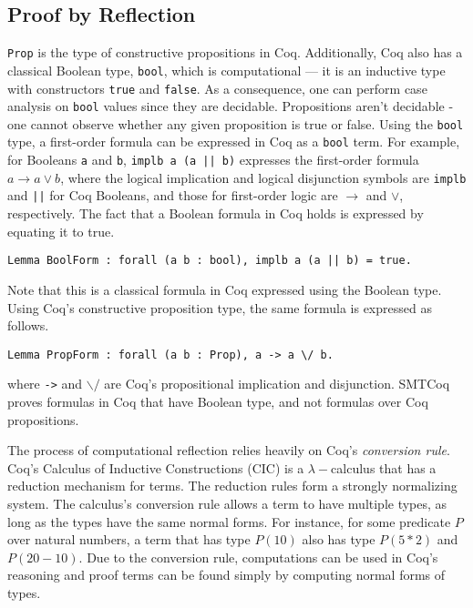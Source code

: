\documentclass{article}
\begin{document}
	\subsection{Proof by Reflection}
	\label{reflect}
	\texttt{Prop} is the type of 
	constructive propositions in Coq. 
	Additionally, Coq also has a 
	classical Boolean type, 
	\texttt{bool}, which is 
	computational --- it is an 
	inductive type with constructors 
	\texttt{true} and \texttt{false}. 
	As a consequence, one can 
	perform case analysis on 
	\texttt{bool} values since they 
	are decidable. Propositions 
	aren't decidable - one cannot 
	observe whether any given 
	proposition is true or false. 	
	Using the \texttt{bool} type, a 
	first-order formula can be 
	expressed in Coq as a \texttt{bool}
	term. For example, for Booleans 
	\texttt{a} and \texttt{b}, 
	\texttt{implb a (a || b)} 
	expresses the first-order formula 
	$a \to a \lor b$, where the logical 
	implication and logical disjunction 
	symbols are \texttt{implb} and 
	\texttt{||} for Coq Booleans, and 
	those for first-order logic are 
	$\to$ and $\lor$, respectively. The 
	fact that a Boolean formula in Coq 
	holds is expressed by equating it to 
	true.
\begin{verbatim}
Lemma BoolForm : forall (a b : bool), implb a (a || b) = true.
\end{verbatim}
	Note that this is a classical formula 
	in Coq expressed using the Boolean type. 
	Using Coq's constructive proposition type,
	the same formula is expressed as follows.
\begin{verbatim}
Lemma PropForm : forall (a b : Prop), a -> a \/ b.
\end{verbatim}
	where \texttt{->} and $\backslash/$ are 
	Coq's propositional implication and 
	disjunction. SMTCoq proves formulas 
	in Coq that have Boolean type, and 
	not formulas over Coq propositions.
	 
	The process of computational 
	reflection relies heavily on 
	Coq's \textit{conversion rule}.
	Coq's Calculus of Inductive 
	Constructions (CIC) is a 
	$\lambda-$calculus that has a 
	reduction mechanism for terms. The
	reduction rules form a strongly 
	normalizing system. The calculus's
	conversion rule allows a term to 
	have multiple types, as long as the 
	types have the same normal forms. For 
	instance, for some predicate $P$ 
	over natural numbers, a term that 
	has type $P(10)$ also has type 
	$P(5*2)$ and $P(20-10)$. Due 
	to the conversion rule, 
	computations can be used in Coq's 
	reasoning and proof terms can be 
	found simply by computing normal 
	forms of types.
	
\end{document}
